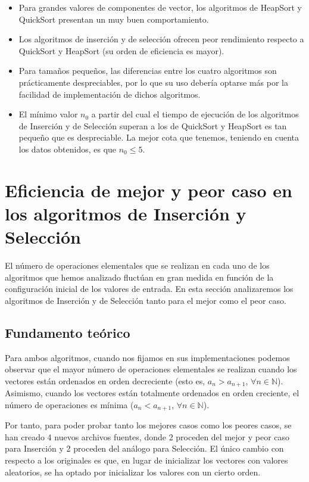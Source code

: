 \documentclass{homework}
\begin{document}
    \begin{itemize}
        \item Para grandes valores de componentes de vector, los algoritmos de HeapSort y QuickSort presentan un muy buen comportamiento.
        \item Los algoritmos de inserción y de selección ofrecen peor rendimiento respecto a QuickSort y HeapSort (su orden de eficiencia es mayor).
        \item Para tamaños pequeños, las diferencias entre los cuatro algoritmos son prácticamente despreciables, por lo que su uso debería optarse más por la facilidad de implementación de dichos algoritmos. 
        \item El mínimo valor $n_0$ a partir del cual el tiempo de ejecución de los algoritmos de Inserción y de Selección superan a los de QuickSort y HeapSort es tan pequeño que es despreciable. 
              La mejor cota que tenemos, teniendo en cuenta los datos obtenidos, es que $n_0 \leq 5$. 
    \end{itemize}

    \newpage
    \section{Eficiencia de mejor y peor caso en los algoritmos de Inserción y Selección}

    El número de operaciones elementales que se realizan en cada uno de los algoritmos que hemos analizado fluctúan 
    en gran medida en función de la configuración inicial de los valores de entrada. En esta sección analizaremos los
    algoritmos de Inserción y de Selección tanto para el mejor como el peor caso.

    \subsection{Fundamento teórico}

    Para ambos algoritmos, cuando nos fijamos en sus implementaciones podemos observar que el mayor número de operaciones
    elementales se realizan cuando los vectores están ordenados en orden decreciente (esto es, $a_n > a_{n+1}$, $\forall n \in \mathbb N$).
    Asimismo, cuando los vectores están totalmente ordenados en orden creciente, el número de operaciones es mínima ($a_n < a_{n+1}$, $\forall n \in \mathbb N$).

    Por tanto, para poder probar tanto los mejores casos como los peores casos, se han creado 4 nuevos archivos fuentes, donde
    2 proceden del mejor y peor caso para Inserción y 2 proceden del análogo para Selección. El único cambio con respecto a los originales es que,
    en lugar de inicializar los vectores con valores aleatorios, se ha optado por inicializar los valores con un cierto orden.
\end{document}
